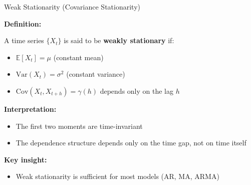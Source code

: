 \documentclass[aspectratio=169]{beamer}
\begin{document}
\begin{frame}{Weak Stationarity (Covariance Stationarity)}

\textbf{Definition:}

\vspace{0.3cm}

A time series $\{X_t\}$ is said to be \textbf{weakly stationary} if:

\begin{itemize}
    \item $\mathbb{E}[X_t] = \mu$ (constant mean)
    \item $\text{Var}(X_t) = \sigma^2$ (constant variance)
    \item $\text{Cov}(X_t, X_{t+h}) = \gamma(h)$ depends only on the lag $h$
\end{itemize}

\vspace{0.4cm}

\textbf{Interpretation:}
\begin{itemize}
    \item The first two moments are time-invariant
    \item The dependence structure depends only on the time gap, not on time itself
\end{itemize}

\vspace{0.4cm}

\textbf{Key insight:}
\begin{itemize}
    \item Weak stationarity is sufficient for most models (AR, MA, ARMA)
\end{itemize}

\end{frame}
\end{document}
